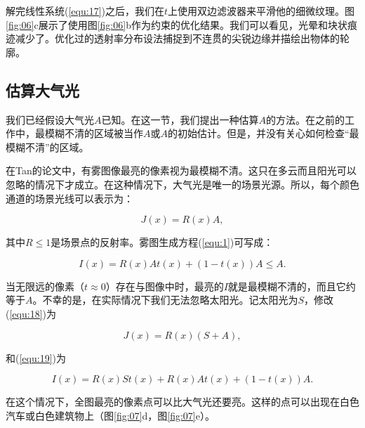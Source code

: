 \documentclass{ctexart}
\begin{document}
解完线性系统(\ref{equ:17})之后，我们在$t$上使用双边滤波器\cite{TomasiManduchi1998}来平滑他的细微纹理。图\ref{fig:06}c展示了使用图\ref{fig:06}b作为约束的优化结果。我们可以看见，光晕和块状痕迹减少了。优化过的透射率分布设法捕捉到不连贯的尖锐边缘并描绘出物体的轮廓。\par

\subsection{估算大气光}\label{sec:4.3}
我们已经假设大气光$A$已知。在这一节，我们提出一种估算$A$的方法。在之前的工作中，最模糊不清的区域被当作$A$\cite{Tan2008}或$A$的初始估计\cite{Fattal2008}。但是，并没有关心如何检查“最模糊不清”的区域。\par

在Tan的论文中\cite{Tan2008}，有雾图像最亮的像素视为最模糊不清。这只在多云而且阳光可以忽略的情况下才成立。在这种情况下，大气光是唯一的场景光源。所以，每个颜色通道的场景光线可以表示为：

\begin{equation}\label{equ:18}
	J(x) = R(x) A,
\end{equation}

其中$R \le 1$是场景点的反射率。雾图生成方程(\ref{equ:1})可写成：

\begin{equation}\label{equ:19}
	I(x) = R(x)At(x) + (1 - t(x))A \le A.
\end{equation}

当无限远的像素（$t \approx 0$）存在与图像中时，最亮的$I$就是最模糊不清的，而且它约等于$A$。不幸的是，在实际情况下我们无法忽略太阳光。记太阳光为$S$，修改(\ref{equ:18})为

\begin{equation}\label{equ:20}
	J(x) = R(x) (S + A),
\end{equation}

和(\ref{equ:19})为

\begin{equation}\label{equ:21}
	I(x) = R(x)St(x) + R(x)At(x) + (1 - t(x))A.
\end{equation}

在这个情况下，全图最亮的像素点可以比大气光还要亮。这样的点可以出现在白色汽车或白色建筑物上（图\ref{fig:07}d，图\ref{fig:07}e）。\par
\end{document}
